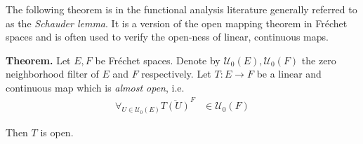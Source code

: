\documentclass[12pt]{article}
\theoremstyle{definition}
\theoremstyle{plain}
\begin{document}
The following theorem is in the functional analysis literature generally referred to as the \emph{Schauder lemma}. It is a version of the open mapping theorem in Fr\'echet spaces and is often used to verify the open-ness of linear, continuous maps.

\textbf{Theorem.} Let $E, F$ be Fr\'echet spaces. Denote by $\mathcal{U}_0(E), \mathcal{U}_0(F)$ the zero neighborhood filter of $E$ and $F$ respectively. Let $T \colon E \to F$ be a linear and continuous map which is \emph{almost open}, i.e. 
\begin{align*}
\forall_{U \in \mathscr{U}_0(E)} \overline{T(U)}^{F} &\in \mathscr{U}_0(F)
\end{align*}

Then $T$ is open.
\end{document}
